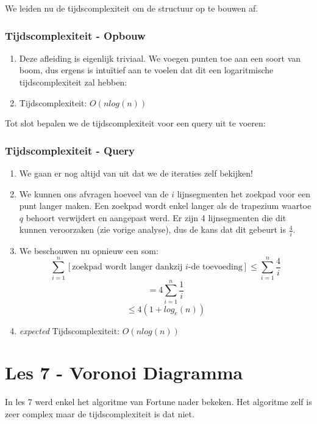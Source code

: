 \documentclass[12pt,a4paper]{article}
\begin{document}
			We leiden nu de tijdscomplexiteit om de structuur op te bouwen af.
			
			\subsubsection{Tijdscomplexiteit - Opbouw}
				\begin{enumerate}
					\item Deze afleiding is eigenlijk triviaal. We voegen punten toe aan een soort van boom, dus ergens is intuïtief aan te voelen dat dit een logaritmische tijdscomplexiteit zal hebben:
					\item Tijdscomplexiteit: $O(n log (n))$
				\end{enumerate}
		
			Tot slot bepalen we de tijdscomplexiteit voor een query uit te voeren:
			
			\subsubsection{Tijdscomplexiteit - Query}
				\begin{enumerate}
					\item We gaan er nog altijd van uit dat we de iteraties zelf bekijken!
					\item We kunnen ons afvragen hoeveel van de $i$ lijnsegmenten het zoekpad voor een punt langer maken. Een zoekpad wordt enkel langer als de trapezium waartoe $q$ behoort verwijdert en aangepast werd. Er zijn 4 lijnsegmenten die dit kunnen veroorzaken (zie vorige analyse), dus de kans dat dit gebeurt is $\frac{4}{i}$.
					\item We beschouwen nu opnieuw een som:
					$$\sum_{i=1}^{n}[\textrm{zoekpad wordt langer dankzij $i$-de toevoeding}] \leq \sum_{i=1}^{n} \frac{4}{i}$$
					$$= 4 \sum_{i=1}^{n}\frac{1}{i}$$
					$$\leq 4(1 + log_e(n))$$
					\item \emph{expected} Tijdscomplexiteit: $O(n log (n))$
				\end{enumerate}
			
	\section{Les 7 - Voronoi Diagramma}
		In les 7 werd enkel het algoritme van Fortune nader bekeken. Het algoritme zelf is zeer complex maar de tijdscomplexiteit is dat niet.
		
\end{document}
